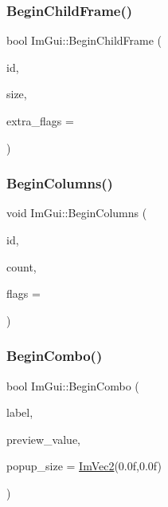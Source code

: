 \hypertarget{namespace_im_gui_a26d6981a769d3fbe9be9a25975b5dc6b}{}\label{namespace_im_gui_a26d6981a769d3fbe9be9a25975b5dc6b} 
\subsubsection{\texorpdfstring{Begin\+Child\+Frame()}{BeginChildFrame()}}
{\footnotesize\ttfamily bool Im\+Gui\+::\+Begin\+Child\+Frame (\begin{DoxyParamCaption}\item[{Im\+Gui\+ID}]{id,  }\item[{const \hyperlink{struct_im_vec2}{Im\+Vec2} \&}]{size,  }\item[{Im\+Gui\+Window\+Flags}]{extra\+\_\+flags = {} }\end{DoxyParamCaption})}

\hypertarget{namespace_im_gui_a4b0c247a5d091c5921c58de6bc8215aa}{}\label{namespace_im_gui_a4b0c247a5d091c5921c58de6bc8215aa} 
\subsubsection{\texorpdfstring{Begin\+Columns()}{BeginColumns()}}
{\footnotesize\ttfamily void Im\+Gui\+::\+Begin\+Columns (\begin{DoxyParamCaption}\item[{const char $\ast$}]{id,  }\item[{int}]{count,  }\item[{Im\+Gui\+Columns\+Flags}]{flags = {} }\end{DoxyParamCaption})}

\hypertarget{namespace_im_gui_a08acc516e0de3cbb99f00774778a440a}{}\label{namespace_im_gui_a08acc516e0de3cbb99f00774778a440a} 
\subsubsection{\texorpdfstring{Begin\+Combo()}{BeginCombo()}}
{\footnotesize\ttfamily bool Im\+Gui\+::\+Begin\+Combo (\begin{DoxyParamCaption}\item[{const char $\ast$}]{label,  }\item[{const char $\ast$}]{preview\+\_\+value,  }\item[{\hyperlink{struct_im_vec2}{Im\+Vec2}}]{popup\+\_\+size = {\ttfamily \hyperlink{struct_im_vec2}{Im\+Vec2}(0.0f,0.0f)} }\end{DoxyParamCaption})}

